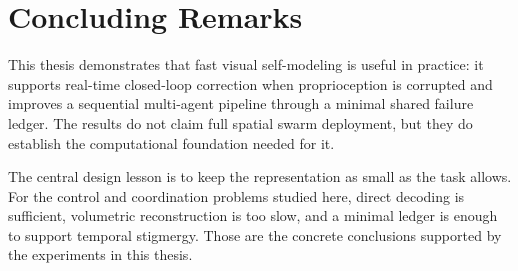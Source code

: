 \documentclass[12pt,a4paper,oneside]{report}
\begin{document}
\section{Concluding Remarks}

This thesis demonstrates that fast visual self-modeling is useful in practice: it supports real-time closed-loop correction when proprioception is corrupted and improves a sequential multi-agent pipeline through a minimal shared failure ledger. The results do not claim full spatial swarm deployment, but they do establish the computational foundation needed for it.

The central design lesson is to keep the representation as small as the task allows. For the control and coordination problems studied here, direct decoding is sufficient, volumetric reconstruction is too slow, and a minimal ledger is enough to support temporal stigmergy. Those are the concrete conclusions supported by the experiments in this thesis.


\end{document}
